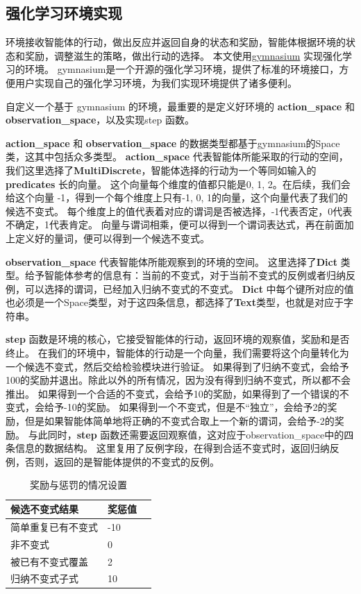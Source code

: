 \subsection{强化学习环境实现}

环境接收智能体的行动，做出反应并返回自身的状态和奖励，智能体根据环境的状态和奖励，调整滋生的策略，做出行动的选择。
本文使用\href{https://gymnasium.farama.org/}{gymnasium} \cite{gymnasium} 实现强化学习的环境。
gymnasium是一个开源的强化学习环境，提供了标准的环境接口，方便用户实现自己的强化学习环境，为我们实现环境提供了诸多便利。

自定义一个基于 gymnasium 的环境，最重要的是定义好环境的 \textbf{action\_space} 和 \textbf{observation\_space}，以及实现step 函数。

\textbf{action\_space} 和 \textbf{observation\_space} 的数据类型都基于gymnasium的Space类，这其中包括众多类型。
\textbf{action\_space} 代表智能体所能采取的行动的空间，我们这里选择了\textbf{MultiDiscrete}，智能体选择的行动为一个等同如输入的 \textbf{predicates} 长的向量。
这个向量每个维度的值都只能是0, 1, 2。在后续，我们会给这个向量 -1，得到一个每个维度上只有-1, 0, 1的向量，这个向量代表了我们的候选不变式。
每个维度上的值代表着对应的谓词是否被选择，-1代表否定，0代表不确定，1代表肯定。
向量与谓词相乘，便可以得到一个谓词表达式，再在前面加上定义好的量词，便可以得到一个候选不变式。

\textbf{observation\_space} 代表智能体所能观察到的环境的空间。
这里选择了\textbf{Dict} 类型。给予智能体参考的信息有：当前的不变式，对于当前不变式的反例或者归纳反例，可以选择的谓词，已经加入归纳不变式的不变式。
\textbf{Dict} 中每个键所对应的值也必须是一个Space类型，对于这四条信息，都选择了\textbf{Text}类型，也就是对应于字符串。

\textbf{step} 函数是环境的核心，它接受智能体的行动，返回环境的观察值，奖励和是否终止。
在我们的环境中，智能体的行动是一个向量，我们需要将这个向量转化为一个候选不变式，然后交给检验模块进行验证。
如果得到了归纳不变式，会给予100的奖励并退出。除此以外的所有情况，因为没有得到归纳不变式，所以都不会推出。
如果得到一个合适的不变式，会给予10的奖励，如果得到了一个错误的不变式，会给予-10的奖励。
如果得到一个不变式，但是不“独立”，会给予2的奖励，但是如果智能体简单地将正确的不变式合取上一个新的谓词，会给予-2的奖励。
与此同时，\textbf{step} 函数还需要返回观察值，这对应于observation\_space中的四条信息的数据结构。
这里复用了反例字段，在得到合适不变式时，返回归纳反例，否则，返回的是智能体提供的不变式的反例。
\begin{table}[!h]
    \label{table:award_punish}
	\centering
	\caption{奖励与惩罚的情况设置}
	\label{tab::situation}
	\renewcommand\arraystretch{1.4}
	\begin{tabular}{p{}p{}p{}}
		\toprule
		\textbf{候选不变式结果}   & \textbf{奖惩值} \\ 
        \midrule
		简单重复已有不变式 & -10 \\
		非不变式      & 0   \\
		被已有不变式覆盖  & 2   \\
		归纳不变式子式   & 10 \\
        \bottomrule
	\end{tabular}
\end{table}

